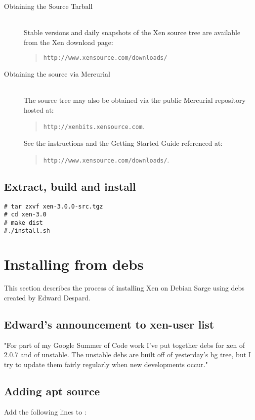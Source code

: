 \begin{description}
\item[Obtaining the Source Tarball]\mbox{} \\
  Stable versions and daily snapshots of the Xen source tree are
  available from the Xen download page:
  \begin{quote} {\tt http://www.xensource.com/downloads/}
  \end{quote}
\item[Obtaining the source via Mercurial]\mbox{} \\
  The source tree may also be obtained via the public Mercurial
  repository hosted at:
  \begin{quote}{\tt http://xenbits.xensource.com}.
  \end{quote} See the instructions and the Getting Started Guide
  referenced at:
  \begin{quote}
    {\tt http://www.xensource.com/downloads/}.
  \end{quote}
\end{description}

\subsection{Extract, build and install}

\begin{verbatim}
# tar zxvf xen-3.0.0-src.tgz
# cd xen-3.0
# make dist
#./install.sh
\end{verbatim}

\section{Installing from debs}
This section describes the process of installing Xen on Debian Sarge using debs created by Edward Despard.

\subsection{Edward's announcement to xen-user list}
"For part of my Google Summer of Code work I've put together debs for xen of 2.0.7 and of unstable. The unstable debs are built off of yesterday's hg tree, but I try to update them fairly regularly when new developments occur." 

\subsection{Adding apt source}
Add the following lines to :

